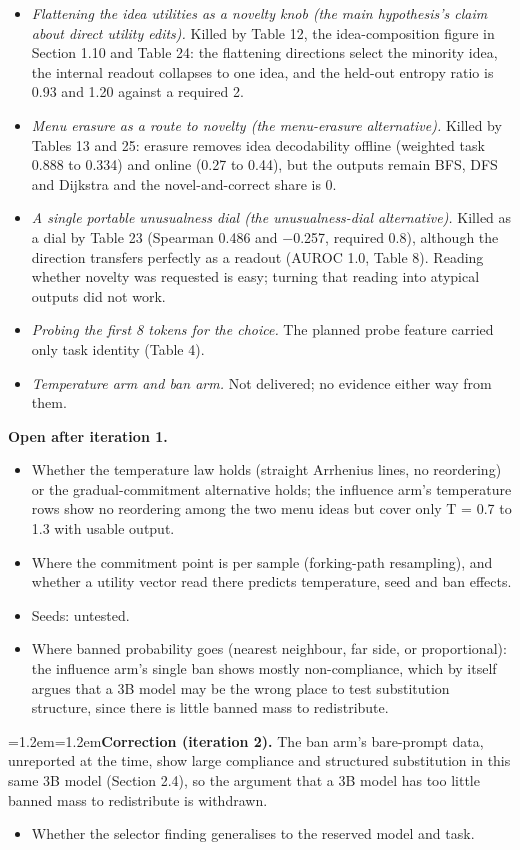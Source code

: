 \documentclass[11pt,letterpaper]{article}
\newenvironment{correction}{\par\medskip\noindent\begin{minipage}{\linewidth}\small\leftskip=1.2em\rightskip=1.2em\noindent}{\end{minipage}\par\medskip}
\begin{document}
\begin{itemize}
\item \emph{Flattening the idea utilities as a novelty knob (the main hypothesis's claim about direct utility edits).} Killed by Table 12, the idea-composition figure in Section 1.10 and Table 24: the flattening directions select the minority idea, the internal readout collapses to one idea, and the held-out entropy ratio is 0.93 and 1.20 against a required 2.
\item \emph{Menu erasure as a route to novelty (the menu-erasure alternative).} Killed by Tables 13 and 25: erasure removes idea decodability offline (weighted task 0.888 to 0.334) and online (0.27 to 0.44), but the outputs remain BFS, DFS and Dijkstra and the novel-and-correct share is 0.
\item \emph{A single portable unusualness dial (the unusualness-dial alternative).} Killed as a dial by Table 23 (Spearman 0.486 and \ensuremath{-}0.257, required 0.8), although the direction transfers perfectly as a readout (AUROC 1.0, Table 8). Reading whether novelty was requested is easy; turning that reading into atypical outputs did not work.
\item \emph{Probing the first 8 tokens for the choice.} The planned probe feature carried only task identity (Table 4).
\item \emph{Temperature arm and ban arm.} Not delivered; no evidence either way from them.
\end{itemize}
\textbf{Open after iteration 1.}

\begin{itemize}
\item Whether the temperature law holds (straight Arrhenius lines, no reordering) or the gradual-commitment alternative holds; the influence arm's temperature rows show no reordering among the two menu ideas but cover only T = 0.7 to 1.3 with usable output.
\item Where the commitment point is per sample (forking-path resampling), and whether a utility vector read there predicts temperature, seed and ban effects.
\item Seeds: untested.
\item Where banned probability goes (nearest neighbour, far side, or proportional): the influence arm's single ban shows mostly non-compliance, which by itself argues that a 3B model may be the wrong place to test substitution structure, since there is little banned mass to redistribute.
\end{itemize}
\begin{correction}\textbf{Correction (iteration 2).} The ban arm's bare-prompt data, unreported at the time, show large compliance and structured substitution in this same 3B model (Section 2.4), so the argument that a 3B model has too little banned mass to redistribute is withdrawn.\end{correction}
\begin{itemize}
\item Whether the selector finding generalises to the reserved model and task.
\end{itemize}
\end{document}
